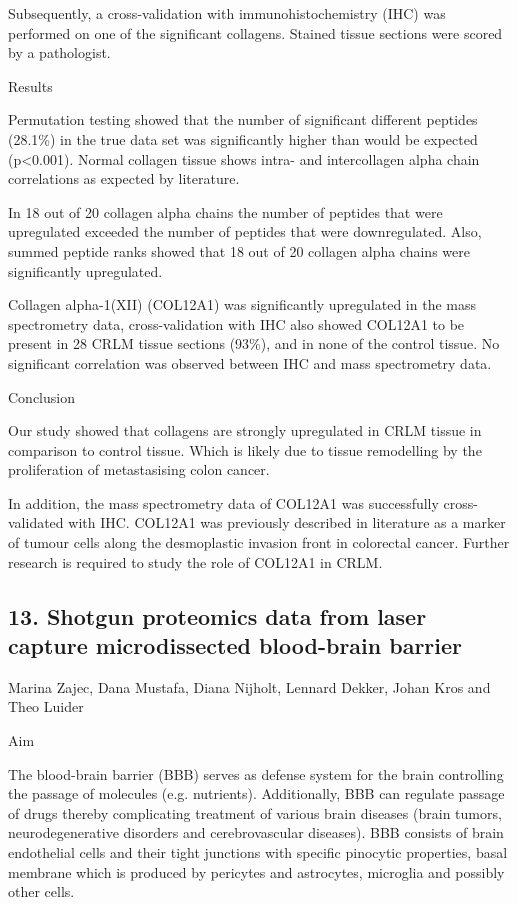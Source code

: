 Subsequently, a cross-validation with immunohistochemistry (IHC) was performed on one of the significant collagens. Stained tissue sections were scored by a pathologist.


Results

Permutation testing showed that the number of significant different peptides (28.1\%) in the true data set was significantly higher than would be expected (p<0.001). Normal collagen tissue shows intra- and intercollagen alpha chain correlations as expected by literature.

In 18 out of 20 collagen alpha chains the number of peptides that were upregulated exceeded the number of peptides that were downregulated. Also, summed peptide ranks showed that 18 out of 20 collagen alpha chains were significantly upregulated.

Collagen alpha-1(XII) (COL12A1) was significantly upregulated in the mass spectrometry data, cross-validation with IHC also showed COL12A1 to be present in 28 CRLM tissue sections (93\%), and in none of the control tissue. No significant correlation was observed between IHC and mass spectrometry data.


Conclusion

Our study showed that collagens are strongly upregulated in CRLM tissue in comparison to control tissue. Which is likely due to tissue remodelling by the proliferation of metastasising colon cancer.

In addition, the mass spectrometry data of COL12A1 was successfully cross-validated with IHC. COL12A1 was previously described in literature as a marker of tumour cells along the desmoplastic invasion front in colorectal cancer. Further research is required to study the role of COL12A1 in CRLM.

\subsection*{\color{eubicRed} 13. Shotgun proteomics data from laser capture microdissected blood-brain barrier}
{\color{eubicGray}Marina Zajec, Dana Mustafa, Diana Nijholt, Lennard Dekker, Johan Kros and Theo Luider}

Aim

The blood-brain barrier (BBB) serves as defense system for the brain controlling the passage of molecules (e.g. nutrients). Additionally, BBB can regulate passage of drugs thereby complicating treatment of various brain diseases (brain tumors, neurodegenerative disorders and cerebrovascular diseases). BBB consists of brain endothelial cells and their tight junctions with specific pinocytic properties, basal membrane which is produced by pericytes and astrocytes, microglia and possibly other cells.

